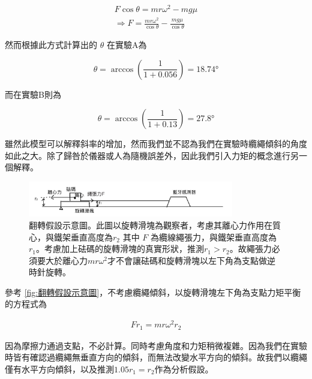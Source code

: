 \documentclass[11pt,a4paper]{article}
\theoremstyle{definition}
\begin{document}
            \begin{gather}
                F \cos{\theta} = mr\omega^2 - m g \mu\\
                \Rightarrow F = \frac{mr\omega^2}{\cos{\theta}} - \frac{mg\mu}{\cos{\theta}}
            \end{gather}

            然而根據此方式計算出的 $\theta$ 在實驗A為

            \begin{equation}
               \theta = \arccos\left( \frac{1}{1 + 0.056} \right) = \ang{18.74}
            \end{equation}

            而在實驗B則為

            \begin{equation}
               \theta = \arccos\left( \frac{1}{1 + 0.13} \right) = \ang{27.8}
            \end{equation}

            雖然此模型可以解釋斜率的增加，然而我們並不認為我們在實驗時纜繩傾斜的角度如此之大。除了歸咎於儀器或人為隨機誤差外，因此我們引入力矩的概念進行另一個解釋。
            
            \par
            \begin{figure}[H]
                \centering
                \includegraphics[width=0.8\textwidth]{翻轉假設示意圖.png}
                \caption{翻轉假設示意圖。此圖以旋轉滑塊為觀察者，考慮其離心力作用在質心，與鐵架垂直高度為$r_2$ 其中 $F$ 為纜線繩張力，與鐵架垂直高度為$r_1$。考慮加上砝碼的旋轉滑塊的真實形狀，推測$r_1 > r_2$。故繩張力必須要大於離心力$mr\omega^2$才不會讓砝碼和旋轉滑塊以左下角為支點做逆時針旋轉。}
                \label{fig:翻轉假設示意圖}
            \end{figure}            
            
            參考 \autoref{fig:翻轉假設示意圖}，不考慮纜繩傾斜，以旋轉滑塊左下角為支點力矩平衡的方程式為

            \begin{gather}
                F r_1 = mr\omega^2 r_2
            \end{gather}

            因為摩擦力通過支點，不必計算。同時考慮角度和力矩稍微複雜。因為我們在實驗時皆有確認過纜繩無垂直方向的傾斜，而無法改變水平方向的傾斜。故我們以纜繩僅有水平方向傾斜，以及推測$1.05 r_1 = r_2$作為分析假設。
\end{document}
